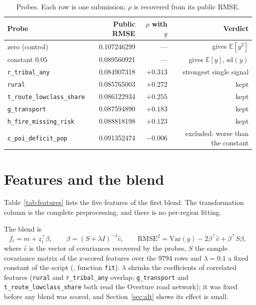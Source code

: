 \documentclass[a4paper]{article}
\newcommand{\Ftribal}{\texttt{r\_tribal\_any}}
\newcommand{\Frural}{\texttt{rural}}
\newcommand{\Ftrans}{\texttt{g\_transport}}
\newcommand{\Froute}{\texttt{t\_route\_lowclass\_share}}
\newcommand{\Ffire}{\texttt{h\_fire\_missing\_risk}}
\newcommand{\Fpoi}{\texttt{c\_poi\_deficit\_pop}}
\newcommand{\R}{\mathrm{RMSE}}
\begin{document}
\begin{table}[htbp]
\centering
\small
\caption{Probes. Each row is one submission; $\rho$ is recovered from its public RMSE.}
\label{tab:probes}
\begin{tabular}{lrrr}
\toprule
Probe & Public RMSE & $\rho$ with $y$ & Verdict \\
\midrule
zero (control) & 0.107246299 & --- & gives $\mathbb{E}[y^2]$ \\
constant $0.05$ & 0.089560921 & --- & gives $\mathbb{E}[y]$, $\mathrm{sd}(y)$ \\
\Ftribal & 0.084907318 & $+0.313$ & strongest single signal \\
\Frural & 0.085765003 & $+0.272$ & kept \\
\Froute & 0.086122934 & $+0.255$ & kept \\
\Ftrans & 0.087594890 & $+0.183$ & kept \\
\Ffire & 0.088818198 & $+0.123$ & kept \\
\Fpoi & 0.091352474 & $-0.006$ & excluded: worse than the constant \\
\bottomrule
\end{tabular}
\end{table}

\section{Features and the blend}

Table~\ref{tab:features} lists the five features of the first blend. The transformation column is the
complete preprocessing, and there is no per-region fitting.

\begin{table}[htbp]
\centering
\caption{The five features of the first blend, their measured correlation with the hidden
score, their ridge coefficients at $\lambda=0.1$, the RMSE cost of dropping each one and, below,
each feature's source and transformation.}
\label{tab:features}
\footnotesize\setlength{\tabcolsep}{3pt}

\end{table}

The blend is
\begin{equation}
f_i = m + z_i^\top \beta, \qquad
\beta = (S + \lambda I)^{-1} \hat{c}, \qquad
\R^2 = \mathrm{Var}(y) - 2\beta^\top \hat{c} + \beta^\top S \beta,
\end{equation}
where $\hat{c}$ is the vector of covariances recovered by the probes, $S$ the sample
covariance matrix of the z-scored features over the \num{9794} rows and $\lambda=0.1$ a
fixed constant of the script (, function \texttt{fit}).
$\lambda$ shrinks the coefficients of correlated features (\Frural{} and \Ftribal{} overlap;
\Ftrans{} and \Froute{} both read the Overture road network); it was fixed before any blend
was scored, and Section~\ref{sec:alt} shows its effect is small.
\end{document}
